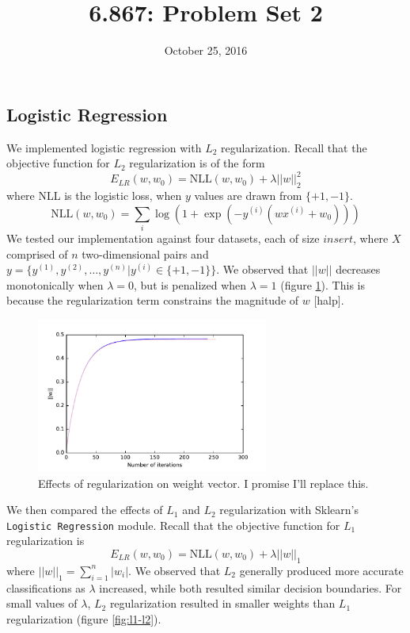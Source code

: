 \documentclass{article}
\title{6.867: Problem Set 2}
\date{October 25, 2016}
\begin{document}
\maketitle

\begin{multicols}{2}


\section{Logistic Regression}

We implemented logistic regression with $L_2$ regularization. Recall that the objective function for $L_2$ regularization is of the form
\begin{equation}
    E_{LR}(w, w_0) = \text{NLL}(w, w_0) + \lambda ||w||_2^2
\end{equation}
where NLL is the logistic loss, when $y$ values are drawn from $\{+1, -1\}$.
\begin{equation}
    \text{NLL}(w, w_0) = \sum_i{\log(1+\exp(-y^{(i)}(wx^{(i)}+w_0)))}
\end{equation}
We tested our implementation against four datasets, each of size $insert$, where $X$ comprised of $n$ two-dimensional pairs and $y=\{y^{(1)}, y^{(2)}, \dots ,y^{(n)} | y^{(i)} \in \{+1, -1\}\}$. We observed that $||w||$ decreases monotonically when $\lambda=0$, but is penalized when $\lambda=1$ (figure \ref{fig:weight-regularization}). This is because the regularization term constrains the magnitude of $w$ [halp].

\begin{figure}
   \centering
   \includegraphics[width=3in]{figures/1-1-weights.pdf}
   \caption{Effects of regularization on weight vector. I promise I'll replace this.}
   \label{fig:weight-regularization}
\end{figure}

We then compared the effects of $L_1$ and $L_2$ regularization with Sklearn's \texttt{Logistic Regression} module. Recall that the objective function for $L_1$ regularization is
\begin{equation}
    E_{LR}(w, w_0) = \text{NLL}(w, w_0) + \lambda ||w||_1
\end{equation}
where $||w||_1 = \sum_{i=1}^n{|w_i|}$.
We observed that $L_2$ generally produced more accurate classifications as $\lambda$ increased, while both resulted similar decision boundaries. For small values of $\lambda$, $L_2$ regularization resulted in smaller weights than $L_1$ regularization (figure \ref{fig:l1-l2}).


\end{multicols}
\end{document}
